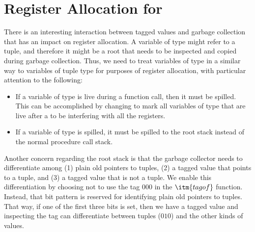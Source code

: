 \documentclass[7x10]{TimesAPriori_MIT}%
\def\racketEd{0}
\def\pythonEd{1}
\def\edition{1}
\newcommand{\racket}[1]{{\if\edition\racketEd{#1}\fi}}
\newcommand{\pythonColor}[0]{}
\newcommand{\python}[1]{{\if\edition\pythonEd\pythonColor #1\fi}}
\newtheorem{exercise}[theorem]{Exercise}
\numberwithin{theorem}{chapter}
\numberwithin{definition}{chapter}
\numberwithin{equation}{chapter}
\begin{document}



\section{Register Allocation for \LangAny{} }
\label{sec:register-allocation-Lany}

There is an interesting interaction between tagged values and garbage
collection that has an impact on register allocation.  A variable of
type \ANYTY{} might refer to a tuple, and therefore it might be a root
that needs to be inspected and copied during garbage collection. Thus,
we need to treat variables of type \ANYTY{} in a similar way to
variables of tuple type for purposes of register allocation,
with particular attention to the following:
\begin{itemize}
\item If a variable of type \ANYTY{} is live during a function call,
  then it must be spilled. This can be accomplished by changing
   to mark all variables of type \ANYTY{}
  that are live after a  to be interfering with all the
  registers.

\item If a variable of type \ANYTY{} is spilled, it must be spilled to
  the root stack instead of the normal procedure call stack.
\end{itemize}

Another concern regarding the root stack is that the garbage collector
needs to differentiate among (1) plain old pointers to tuples, (2) a
tagged value that points to a tuple, and (3) a tagged value that is
not a tuple. We enable this differentiation by choosing not to use the
tag $000$ in the $\itm{tagof}$ function. Instead, that bit pattern is
reserved for identifying plain old pointers to tuples. That way, if
one of the first three bits is set, then we have a tagged value and
inspecting the tag can differentiate between tuples ($010$) and the
other kinds of values.

\end{document}
